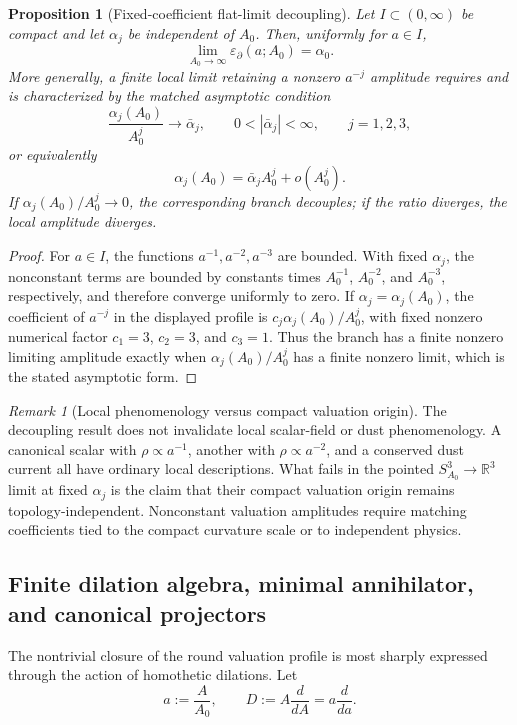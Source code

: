 \documentclass[11pt,a4paper]{article}
\def\dd{d}%
\def\Dil{D}%
\numberwithin{equation}{section}
\theoremstyle{definition}
\theoremstyle{plain}
\newtheorem{proposition}[criterion]{Proposition}
\theoremstyle{remark}
\newtheorem{remark}[criterion]{Remark}
\newcommand{\Dil}{\mathscr{D}}
\newcommand{\dd}{\mathrm{d}}
\begin{document}
\begin{proposition}[Fixed-coefficient flat-limit decoupling]
Let \(I\subset(0,\infty)\) be compact and let \(\alpha_j\) be independent of \(A_0\). Then, uniformly for \(a\in I\),
\begin{equation}
\lim_{A_0\to\infty}\varepsilon_{\partial}(a;A_0)=\alpha_0.
\end{equation}
More generally, a finite local limit retaining a nonzero \(a^{-j}\) amplitude requires and is characterized by the matched asymptotic condition
\begin{equation}
\frac{\alpha_j(A_0)}{A_0^j}\longrightarrow \bar\alpha_j,
\qquad
0<|\bar\alpha_j|<\infty,
\qquad j=1,2,3,
\end{equation}
or equivalently
\begin{equation}
\alpha_j(A_0)=\bar\alpha_j A_0^j+o(A_0^j).
\end{equation}
If \(\alpha_j(A_0)/A_0^j\to0\), the corresponding branch decouples; if the ratio diverges, the local amplitude diverges.
\end{proposition}
\begin{proof}
For \(a\in I\), the functions \(a^{-1},a^{-2},a^{-3}\) are bounded.  With fixed \(\alpha_j\), the nonconstant terms are bounded by constants times \(A_0^{-1}\), \(A_0^{-2}\), and \(A_0^{-3}\), respectively, and therefore converge uniformly to zero.  If \(\alpha_j=\alpha_j(A_0)\), the coefficient of \(a^{-j}\) in the displayed profile is \(c_j\alpha_j(A_0)/A_0^j\), with fixed nonzero numerical factor \(c_1=3\), \(c_2=3\), and \(c_3=1\).  Thus the branch has a finite nonzero limiting amplitude exactly when \(\alpha_j(A_0)/A_0^j\) has a finite nonzero limit, which is the stated asymptotic form.
\end{proof}

\begin{remark}[Local phenomenology versus compact valuation origin]
The decoupling result does not invalidate local scalar-field or dust phenomenology.  A canonical scalar with \(\rho\propto a^{-1}\), another with \(\rho\propto a^{-2}\), and a conserved dust current all have ordinary local descriptions. What fails in the pointed \(S^3_{A_0}\to\mathbb R^3\) limit at fixed \(\alpha_j\) is the claim that their compact valuation origin remains topology-independent. Nonconstant valuation amplitudes require matching coefficients tied to the compact curvature scale or to independent physics.
\end{remark}

\subsection{Finite dilation algebra, minimal annihilator, and canonical projectors}
The nontrivial closure of the round valuation profile is most sharply expressed through the action of homothetic dilations.  Let
\begin{equation}
a:=\frac{A}{A_0},
\qquad
\Dil:=A\frac{\dd}{\dd A}=a\frac{\dd}{\dd a}.
\end{equation}
\end{document}

